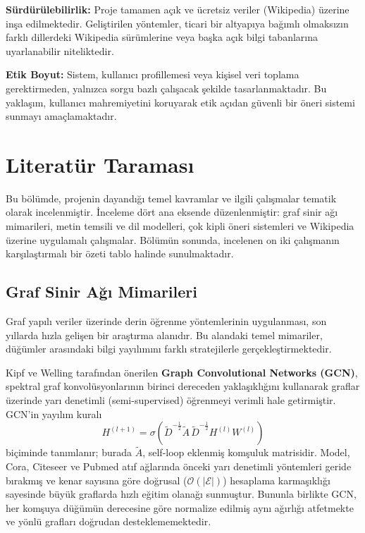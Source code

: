 \documentclass[12pt, a4paper]{article}
\begin{document}
\textbf{Sürdürülebilirlik:}
Proje tamamen açık ve ücretsiz veriler (Wikipedia) üzerine inşa edilmektedir. Geliştirilen yöntemler, ticari bir altyapıya bağımlı olmaksızın farklı dillerdeki Wikipedia sürümlerine veya başka açık bilgi tabanlarına uyarlanabilir niteliktedir.

\textbf{Etik Boyut:}
Sistem, kullanıcı profillemesi veya kişisel veri toplama gerektirmeden, yalnızca sorgu bazlı çalışacak şekilde tasarlanmaktadır. Bu yaklaşım, kullanıcı mahremiyetini koruyarak etik açıdan güvenli bir öneri sistemi sunmayı amaçlamaktadır.

\section{Literatür Taraması}

Bu bölümde, projenin dayandığı temel kavramlar ve ilgili çalışmalar tematik olarak incelenmiştir. İnceleme dört ana eksende düzenlenmiştir: graf sinir ağı mimarileri, metin temsili ve dil modelleri, çok kipli öneri sistemleri ve Wikipedia üzerine uygulamalı çalışmalar. Bölümün sonunda, incelenen on iki çalışmanın karşılaştırmalı bir özeti tablo halinde sunulmaktadır.

\subsection{Graf Sinir Ağı Mimarileri}

Graf yapılı veriler üzerinde derin öğrenme yöntemlerinin uygulanması, son yıllarda hızla gelişen bir araştırma alanıdır. Bu alandaki temel mimariler, düğümler arasındaki bilgi yayılımını farklı stratejilerle gerçekleştirmektedir.

Kipf ve Welling \cite{kipf2017semi} tarafından önerilen \textbf{Graph Convolutional Networks (GCN)}, spektral graf konvolüsyonlarının birinci dereceden yaklaşıklığını kullanarak graflar üzerinde yarı denetimli (semi-supervised) öğrenmeyi verimli hale getirmiştir. GCN'in yayılım kuralı
\[
    H^{(l+1)} = \sigma\!\left(\tilde{D}^{-\frac{1}{2}}\tilde{A}\,\tilde{D}^{-\frac{1}{2}}H^{(l)}W^{(l)}\right)
\]
biçiminde tanımlanır; burada $\tilde{A}$, self-loop eklenmiş komşuluk matrisidir. Model, Cora, Citeseer ve Pubmed atıf ağlarında önceki yarı denetimli yöntemleri geride bırakmış ve kenar sayısına göre doğrusal ($\mathcal{O}(|\mathcal{E}|)$) hesaplama karmaşıklığı sayesinde büyük graflarda hızlı eğitim olanağı sunmuştur. Bununla birlikte GCN, her komşuya düğümün derecesine göre normalize edilmiş aynı ağırlığı atfetmekte ve yönlü grafları doğrudan desteklememektedir.
\end{document}
